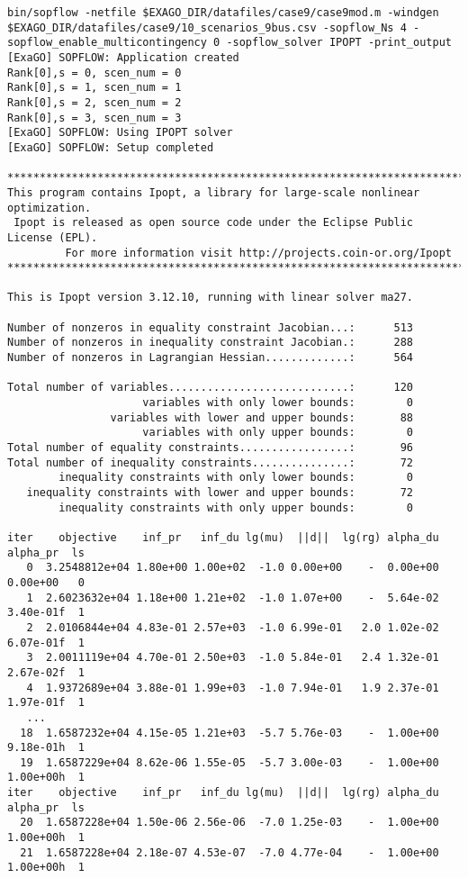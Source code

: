 \begin{lstlisting}
bin/sopflow -netfile $EXAGO_DIR/datafiles/case9/case9mod.m -windgen $EXAGO_DIR/datafiles/case9/10_scenarios_9bus.csv -sopflow_Ns 4 -sopflow_enable_multicontingency 0 -sopflow_solver IPOPT -print_output
[ExaGO] SOPFLOW: Application created
Rank[0],s = 0, scen_num = 0
Rank[0],s = 1, scen_num = 1
Rank[0],s = 2, scen_num = 2
Rank[0],s = 3, scen_num = 3
[ExaGO] SOPFLOW: Using IPOPT solver
[ExaGO] SOPFLOW: Setup completed

******************************************************************************
This program contains Ipopt, a library for large-scale nonlinear optimization.
 Ipopt is released as open source code under the Eclipse Public License (EPL).
         For more information visit http://projects.coin-or.org/Ipopt
******************************************************************************

This is Ipopt version 3.12.10, running with linear solver ma27.

Number of nonzeros in equality constraint Jacobian...:      513
Number of nonzeros in inequality constraint Jacobian.:      288
Number of nonzeros in Lagrangian Hessian.............:      564

Total number of variables............................:      120
                     variables with only lower bounds:        0
                variables with lower and upper bounds:       88
                     variables with only upper bounds:        0
Total number of equality constraints.................:       96
Total number of inequality constraints...............:       72
        inequality constraints with only lower bounds:        0
   inequality constraints with lower and upper bounds:       72
        inequality constraints with only upper bounds:        0

iter    objective    inf_pr   inf_du lg(mu)  ||d||  lg(rg) alpha_du alpha_pr  ls
   0  3.2548812e+04 1.80e+00 1.00e+02  -1.0 0.00e+00    -  0.00e+00 0.00e+00   0
   1  2.6023632e+04 1.18e+00 1.21e+02  -1.0 1.07e+00    -  5.64e-02 3.40e-01f  1
   2  2.0106844e+04 4.83e-01 2.57e+03  -1.0 6.99e-01   2.0 1.02e-02 6.07e-01f  1
   3  2.0011119e+04 4.70e-01 2.50e+03  -1.0 5.84e-01   2.4 1.32e-01 2.67e-02f  1
   4  1.9372689e+04 3.88e-01 1.99e+03  -1.0 7.94e-01   1.9 2.37e-01 1.97e-01f  1
   ...
  18  1.6587232e+04 4.15e-05 1.21e+03  -5.7 5.76e-03    -  1.00e+00 9.18e-01h  1
  19  1.6587229e+04 8.62e-06 1.55e-05  -5.7 3.00e-03    -  1.00e+00 1.00e+00h  1
iter    objective    inf_pr   inf_du lg(mu)  ||d||  lg(rg) alpha_du alpha_pr  ls
  20  1.6587228e+04 1.50e-06 2.56e-06  -7.0 1.25e-03    -  1.00e+00 1.00e+00h  1
  21  1.6587228e+04 2.18e-07 4.53e-07  -7.0 4.77e-04    -  1.00e+00 1.00e+00h  1


\end{lstlisting}
